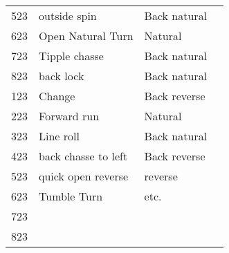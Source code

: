 \documentclass[10pt]{article}
\begin{document}
\begin{tabular}{r l l l}
    523  & outside spin            & Back natural           &                     \\
    623  & Open Natural Turn       & Natural                &                     \\
    723  & Tipple chasse           & Back natural           &                     \\
    823  & back lock               & Back natural           &                     \\
    123  & Change                  & Back reverse           &                     \\
    223  & Forward run             & Natural                &                     \\
    323  & Line roll               & Back natural           &                     \\
    423  & back chasse to left     & Back reverse           &                     \\
    523  & quick open reverse      & reverse                &                     \\
    623  & Tumble Turn             & etc.                   &                     \\
    723  &                         &                        &                     \\
    823  &                         &                        &                     \\
    \bottomrule
\end{tabular}
\end{document}
